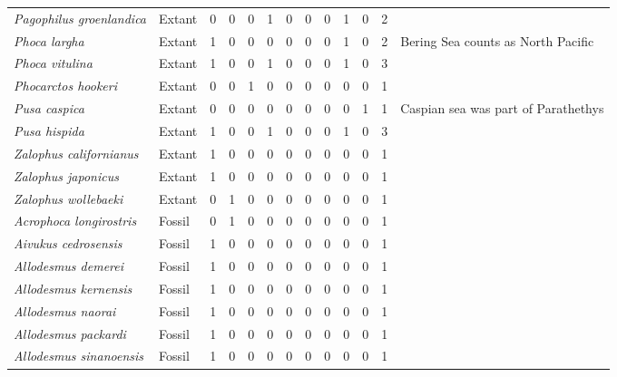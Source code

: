 \begin{longtable}{llccccccccccp{}}
\textit{Pagophilus groenlandica} &
Extant &
0 &
0 &
0 &
1 &
0 &
0 &
0 &
1 &
0 &
2 &
\\

\textit{Phoca largha} &
Extant &
1 &
0 &
0 &
0 &
0 &
0 &
0 &
1 &
0 &
2 &
Bering Sea counts as North Pacific\\

\textit{Phoca vitulina} &
Extant &
1 &
0 &
0 &
1 &
0 &
0 &
0 &
1 &
0 &
3 &
\\

\textit{Phocarctos hookeri} &
Extant &
0 &
0 &
1 &
0 &
0 &
0 &
0 &
0 &
0 &
1 &
\\

\textit{Pusa caspica} &
Extant &
0 &
0 &
0 &
0 &
0 &
0 &
0 &
0 &
1 &
1 &
Caspian sea was part of Parathethys\\

\textit{Pusa hispida} &
Extant &
1 &
0 &
0 &
1 &
0 &
0 &
0 &
1 &
0 &
3 &
\\

\textit{Zalophus californianus} &
Extant &
1 &
0 &
0 &
0 &
0 &
0 &
0 &
0 &
0 &
1 &
\\

\textit{Zalophus japonicus} &
Extant &
1 &
0 &
0 &
0 &
0 &
0 &
0 &
0 &
0 &
1 &
\\

\textit{Zalophus wollebaeki} &
Extant &
0 &
1 &
0 &
0 &
0 &
0 &
0 &
0 &
0 &
1 &
\\

\textit{Acrophoca longirostris} &
Fossil &
0 &
1 &
0 &
0 &
0 &
0 &
0 &
0 &
0 &
1 &
\\

\textit{Aivukus cedrosensis} &
Fossil &
1 &
0 &
0 &
0 &
0 &
0 &
0 &
0 &
0 &
1 &
\\

\textit{Allodesmus demerei} &
Fossil &
1 &
0 &
0 &
0 &
0 &
0 &
0 &
0 &
0 &
1 &
\\

\textit{Allodesmus kernensis} &
Fossil &
1 &
0 &
0 &
0 &
0 &
0 &
0 &
0 &
0 &
1 &
\\

\textit{Allodesmus naorai} &
Fossil &
1 &
0 &
0 &
0 &
0 &
0 &
0 &
0 &
0 &
1 &
\\

\textit{Allodesmus packardi} &
Fossil &
1 &
0 &
0 & 
0 &
0 &
0 &
0 &
0 &
0 &
1 &
\\

\textit{Allodesmus sinanoensis} &
Fossil &
1 &
0 &
0 &
0 &
0 &
0 &
0 &
0 &
0 &
1 &
\\


\end{longtable}
